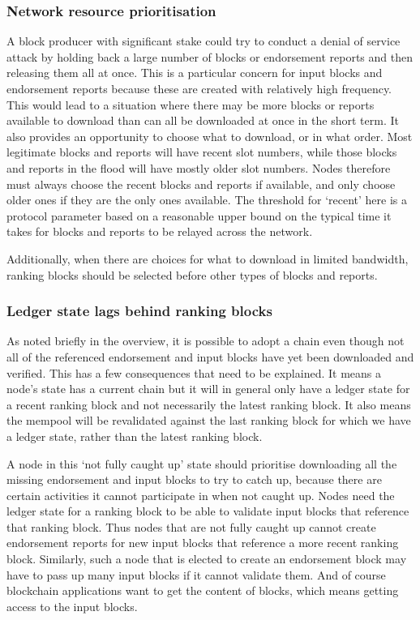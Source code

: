 \documentclass[11pt,a4paper]{article}
\begin{document}
\subsubsection{Network resource prioritisation}
A block producer with significant stake could try to conduct a denial of
service attack by holding back a large number of blocks or endorsement reports
and then releasing them all at once. This is a particular concern for input
blocks and endorsement reports because these are created with relatively high
frequency. This would lead to a situation where there may be more blocks or
reports available to download than can all be downloaded at once in the short
term. It also provides an opportunity to choose what to download, or in what
order. Most legitimate blocks and reports will have recent slot numbers, while
those blocks and reports in the flood will have mostly older slot numbers.
Nodes therefore must always choose the recent blocks and reports if available,
and only choose older ones if they are the only ones available. The threshold
for `recent' here is a protocol parameter based on a reasonable upper bound on
the typical time it takes for blocks and reports to be relayed across the
network.

Additionally, when there are choices for what to download in limited bandwidth,
ranking blocks should be selected before other types of blocks and reports.

\subsubsection{Ledger state lags behind ranking blocks}
As noted briefly in the overview, it is possible to adopt a chain even though
not all of the referenced endorsement and input blocks have yet been downloaded
and verified. This has a few consequences that need to be explained. It means
a node's state has a current chain but it will in general only have a ledger
state for a recent ranking block and not necessarily the latest ranking block.
It also means the mempool will be revalidated against the last ranking block
for which we have a ledger state, rather than the latest ranking block.

A node in this `not fully caught up' state should prioritise downloading all
the missing endorsement and input blocks to try to catch up, because there are
certain activities it cannot participate in when not caught up. Nodes need the
ledger state for a ranking block to be able to validate input blocks that
reference that ranking block. Thus nodes that are not fully caught up cannot
create endorsement reports for new input blocks that reference a more recent
ranking block. Similarly, such a node that is elected to create an endorsement
block may have to pass up many input blocks if it cannot validate them. And
of course blockchain applications want to get the content of blocks, which
means getting access to the input blocks.
\end{document}
